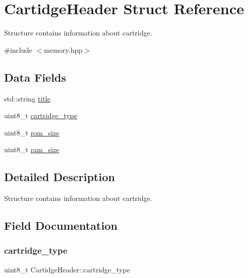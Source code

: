 \hypertarget{structCartidgeHeader}{}\section{Cartidge\+Header Struct Reference}
\label{structCartidgeHeader}


Structure contains information about cartridge.  




{\ttfamily \#include $<$memory.\+hpp$>$}

\subsection*{Data Fields}
\begin{DoxyCompactItemize}
\item 
std\+::string \mbox{\hyperlink{structCartidgeHeader_ad546e51873dc7099aee09146ccb6ac34}{title}}
\item 
uint8\+\_\+t \mbox{\hyperlink{structCartidgeHeader_ace024d4f3f989eef279c9c0620818e07}{cartridge\+\_\+type}}
\item 
uint8\+\_\+t \mbox{\hyperlink{structCartidgeHeader_a9c7accc3cb7f2e43e49e04cdc596f763}{rom\+\_\+size}}
\item 
uint8\+\_\+t \mbox{\hyperlink{structCartidgeHeader_aac25eb523721a21c39c24cdb3fa8c4d3}{ram\+\_\+size}}
\end{DoxyCompactItemize}


\subsection{Detailed Description}
Structure contains information about cartridge. 

\subsection{Field Documentation}
\mbox{\label{structCartidgeHeader_ace024d4f3f989eef279c9c0620818e07}} 
\subsubsection{\texorpdfstring{cartridge\+\_\+type}{cartridge\_type}}
{\footnotesize\ttfamily uint8\+\_\+t Cartidge\+Header\+::cartridge\+\_\+type}

